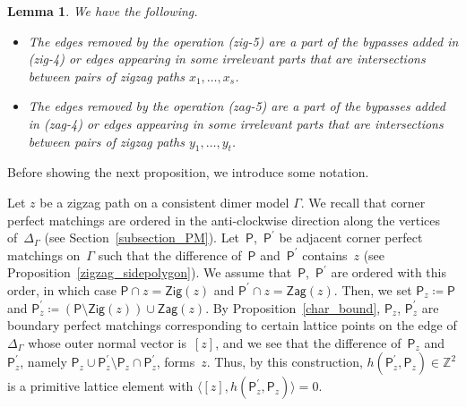 \documentclass[pdftex]{sigma}%
\numberwithin{equation}{section}
\numberwithin{figure}{section}
\numberwithin{table}{section}
\newtheorem{Lemma}[Theorem]{Lemma}
\newcommand{\ZZ}{\mathbb{Z}}
\newcommand{\sfP}{\mathsf{P}}
\newcommand{\Zig}{\mathsf{Zig}}
\newcommand{\Zag}{\mathsf{Zag}}
\begin{document}
\begin{Lemma}\label{bypass_removable}
We have the following.
\begin{itemize}\itemsep=0pt
\item[\rm (1)] The edges removed by the operation {\rm(zig-5)} are a part of the bypasses added in {\rm(zig-4)} or edges appearing in some irrelevant parts that are intersections between pairs of zigzag paths $x_1,\dots,x_s$.
\item[\rm (2)] The edges removed by the operation {\rm(zag-5)} are a part of the bypasses added in {\rm(zag-4)} or edges appearing in some irrelevant parts that are intersections between pairs of zigzag paths $y_1,\dots,y_t$.
\end{itemize}
\end{Lemma}

Before showing the next proposition, we introduce some notation.

\begin{setting}\label{setting_PMs_z}
Let $z$ be a zigzag path on a consistent dimer model $\Gamma$.
We recall that corner perfect matchings are ordered in the anti-clockwise direction along the vertices of~$\Delta_\Gamma$ (see Section~\ref{subsection_PM}).
Let~$\sfP$,~$\sfP^\prime$ be adjacent corner perfect matchings on~$\Gamma$ such that the difference of~$\sfP$ and~$\sfP^\prime$ contains~$z$ (see Proposition~\ref{zigzag_sidepolygon}).
We assume that~$\sfP$,~$\sfP^\prime$ are ordered with this order, in which case $\sfP\cap z=\Zig(z)$ and $\sfP^\prime\cap z=\Zag(z)$.
Then, we set $\sfP_z\coloneqq \sfP$ and $\sfP^\prime_z\coloneqq (\sfP{\setminus}\Zig(z))\cup\Zag(z)$.
By Proposition~\ref{char_bound}, $\sfP_z$, $\sfP^\prime_z$ are boundary perfect matchings corresponding to certain lattice points on the edge of $\Delta_\Gamma$ whose outer normal vector is~$[z]$,
and we see that the difference of~$\sfP_z$ and~$\sfP^\prime_z$, namely $\sfP_z\cup\sfP^\prime_z{\setminus}\sfP_z\cap\sfP^\prime_z$, forms~$z$.
Thus, by this construction, $h(\sfP^\prime_z,\sfP_z)\in\ZZ^2$ is a primitive lattice element with $\langle[z],h(\sfP^\prime_z,\sfP_z)\rangle=0$.
\end{setting}
\end{document}
